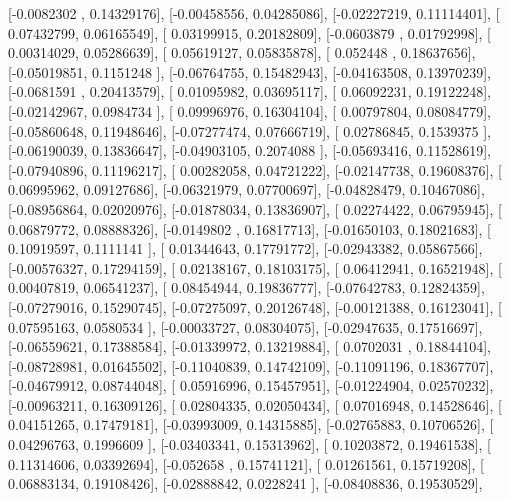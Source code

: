 \documentclass{article}
\begin{document}
       [-0.0082302 ,  0.14329176],
       [-0.00458556,  0.04285086],
       [-0.02227219,  0.11114401],
       [ 0.07432799,  0.06165549],
       [ 0.03199915,  0.20182809],
       [-0.0603879 ,  0.01792998],
       [ 0.00314029,  0.05286639],
       [ 0.05619127,  0.05835878],
       [ 0.052448  ,  0.18637656],
       [-0.05019851,  0.1151248 ],
       [-0.06764755,  0.15482943],
       [-0.04163508,  0.13970239],
       [-0.0681591 ,  0.20413579],
       [ 0.01095982,  0.03695117],
       [ 0.06092231,  0.19122248],
       [-0.02142967,  0.0984734 ],
       [ 0.09996976,  0.16304104],
       [ 0.00797804,  0.08084779],
       [-0.05860648,  0.11948646],
       [-0.07277474,  0.07666719],
       [ 0.02786845,  0.1539375 ],
       [-0.06190039,  0.13836647],
       [-0.04903105,  0.2074088 ],
       [-0.05693416,  0.11528619],
       [-0.07940896,  0.11196217],
       [ 0.00282058,  0.04721222],
       [-0.02147738,  0.19608376],
       [ 0.06995962,  0.09127686],
       [-0.06321979,  0.07700697],
       [-0.04828479,  0.10467086],
       [-0.08956864,  0.02020976],
       [-0.01878034,  0.13836907],
       [ 0.02274422,  0.06795945],
       [ 0.06879772,  0.08888326],
       [-0.0149802 ,  0.16817713],
       [-0.01650103,  0.18021683],
       [ 0.10919597,  0.1111141 ],
       [ 0.01344643,  0.17791772],
       [-0.02943382,  0.05867566],
       [-0.00576327,  0.17294159],
       [ 0.02138167,  0.18103175],
       [ 0.06412941,  0.16521948],
       [ 0.00407819,  0.06541237],
       [ 0.08454944,  0.19836777],
       [-0.07642783,  0.12824359],
       [-0.07279016,  0.15290745],
       [-0.07275097,  0.20126748],
       [-0.00121388,  0.16123041],
       [ 0.07595163,  0.0580534 ],
       [-0.00033727,  0.08304075],
       [-0.02947635,  0.17516697],
       [-0.06559621,  0.17388584],
       [-0.01339972,  0.13219884],
       [ 0.0702031 ,  0.18844104],
       [-0.08728981,  0.01645502],
       [-0.11040839,  0.14742109],
       [-0.11091196,  0.18367707],
       [-0.04679912,  0.08744048],
       [ 0.05916996,  0.15457951],
       [-0.01224904,  0.02570232],
       [-0.00963211,  0.16309126],
       [ 0.02804335,  0.02050434],
       [ 0.07016948,  0.14528646],
       [ 0.04151265,  0.17479181],
       [-0.03993009,  0.14315885],
       [-0.02765883,  0.10706526],
       [ 0.04296763,  0.1996609 ],
       [-0.03403341,  0.15313962],
       [ 0.10203872,  0.19461538],
       [ 0.11314606,  0.03392694],
       [-0.052658  ,  0.15741121],
       [ 0.01261561,  0.15719208],
       [ 0.06883134,  0.19108426],
       [-0.02888842,  0.0228241 ],
       [-0.08408836,  0.19530529],
\end{document}
